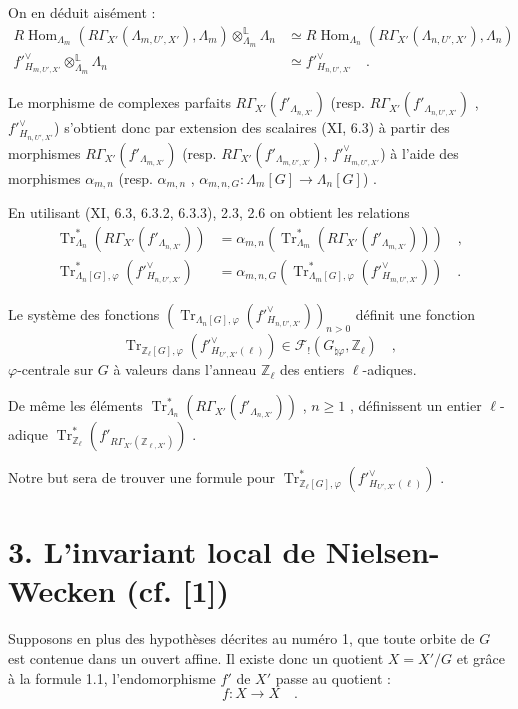 \documentclass[11pt]{article}
\DeclareMathOperator{\Hom}{Hom}
\providecommand{\Tr}{\operatorname{Tr}}
\providecommand{\Tr}{\operatorname{Tr}}
\providecommand{\Tr}{\operatorname{Tr}}
\providecommand{\Hom}{\operatorname{Hom}}
\providecommand{\Tr}{\operatorname{Tr}}
\providecommand{\La}{\Lambda}
\providecommand{\bZ}{\mathbb Z}
\providecommand{\Hom}{\operatorname{Hom}}
\providecommand{\Tr}{\operatorname{Tr}}
\begin{document}
On en déduit aisément :
\begin{align}
\tag{2.5} R\Hom_{\La_m}(R\Gamma_{X'}(\La_{m,U',X'}), \La_m) \otimes_{\La_m}^{\mathbb{L}} \La_n &\simeq R\Hom_{\La_n}(R\Gamma_{X'}(\La_{n,U',X'}), \La_n) \\
\tag{2.6} f'^\vee_{H_{m,U',X'}} \otimes_{\La_m}^{\mathbb{L}} \La_n &\simeq f'^\vee_{H_{n,U',X'}} \quad .
\end{align}

Le morphisme de complexes parfaits $R\Gamma_{X'}(f'_{\La_{n,X'}})$ (resp. $R\Gamma_{X'}(f'_{\La_{n,U',X'}})$ , $f'^\vee_{H_{n,U',X'}}$) s'obtient donc par extension des scalaires (XI, 6.3) à partir des morphismes $R\Gamma_{X'}(f'_{\La_{m,X'}})$ (resp. $R\Gamma_{X'}(f'_{\La_{m,U',X'}})$, $f'^\vee_{H_{m,U',X'}}$) à l'aide des morphismes $\alpha_{m,n}$ (resp. $\alpha_{m,n}$ , $\alpha_{m,n,G} : \La_m[G] \longrightarrow \La_n[G]$) .

En utilisant (XI, 6.3, 6.3.2, 6.3.3), 2.3, 2.6 on obtient les relations
\begin{align}
\tag{2.7} \Tr^*_{\La_n}(R\Gamma_{X'}(f'_{\La_{n,X'}})) &= \alpha_{m,n}(\Tr^*_{\La_m}(R\Gamma_{X'}(f'_{\La_{m,X'}}))) \quad , \\
\tag{2.8} \Tr^*_{\La_n[G],\varphi}(f'^\vee_{H_{n,U',X'}}) &= \alpha_{m,n,G}(\Tr^*_{\La_m[G],\varphi}(f'^\vee_{H_{m,U',X'}})) \quad .
\end{align}

Le système des fonctions $(\Tr_{\La_n[G],\varphi}(f'^\vee_{H_{n,U',X'}}))_{n>0}$ définit une fonction
\[
\Tr_{\bZ_\ell[G],\varphi}(f'^\vee_{H_{U',X'}(\ell)}) \in \mathcal{F}_!(G_{\natural\varphi}, \bZ_\ell) \quad ,
\]
$\varphi$-centrale sur $G$ à valeurs dans l'anneau $\bZ_\ell$ des entiers $\ell$-adiques.

De même les éléments $\Tr^*_{\La_n}(R\Gamma_{X'}(f'_{\La_{n,X'}}))$ , $n \geq 1$ , définissent un entier $\ell$-adique $\Tr^*_{\bZ_\ell}(f'_{R\Gamma_{X'}(\bZ_{\ell,X'})})$ .

Notre but sera de trouver une formule pour $\Tr^*_{\bZ_\ell[G],\varphi}(f'^\vee_{H_{U',X'}(\ell)})$ .


\section*{3. L'invariant local de Nielsen-Wecken (cf. [1])}
Supposons en plus des hypothèses décrites au numéro 1, que toute orbite de $G$ est contenue dans un ouvert affine. Il existe donc un quotient $X = X'/G$ et grâce à la formule 1.1, l'endomorphisme $f'$ de $X'$ passe au quotient :
\[
f : X \longrightarrow X \quad .
\]
\end{document}
